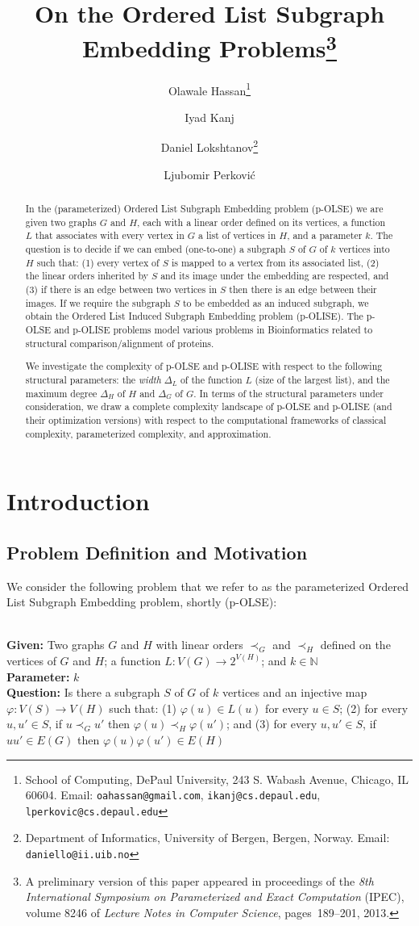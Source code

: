 \documentclass[11pt]{article}
\date{}
\title{On the Ordered List Subgraph Embedding Problems\footnote{A preliminary version of this paper appeared in proceedings of the {\em 8th International Symposium on Parameterized and Exact Computation} (IPEC), volume 8246 of {\em Lecture Notes in Computer Science}, pages~189--201, 2013.}}
\author{
{\sc Olawale Hassan}\footnote{School of
Computing, DePaul University, 243 S. Wabash Avenue, Chicago, IL
60604. Email: {\tt oahassan@gmail.com}, {\tt ikanj@cs.depaul.edu}, {\tt lperkovic@cs.depaul.edu}}
\and
{\sc Iyad Kanj}\footnotemark[2]
\and
{\sc Daniel Lokshtanov}\thanks{Department of Informatics,
University of Bergen, Bergen, Norway.  Email: {\tt daniello@ii.uib.no}}
\and
{\sc Ljubomir Perkovi\'{c}}\footnotemark[2]
}
\newcommand{\paramproblem}[4]{\noindent {\sc #1}
\\
{\bf Given:} #2\\
{\bf Parameter:} #3\\
{\bf Question:} #4}
\newcommand{\nat}{\mathbb{N}}
\let\phi=\varphi
\begin{document}
\maketitle

\begin{abstract}
In the (parameterized) {\sc Ordered List Subgraph Embedding} problem (p-OLSE) we are given two graphs $G$ and $H$, each with a linear order defined on its vertices, a function $L$ that associates with every vertex in $G$ a list of vertices in $H$, and a parameter $k$. The question is to decide if we can embed (one-to-one) a subgraph $S$ of $G$ of $k$ vertices into $H$ such that: (1) every vertex of $S$ is mapped to a vertex from its associated list, (2) the linear orders inherited by $S$ and its image under the embedding are respected, and (3) if there is an edge between two vertices in $S$ then there is an edge between their images. If we require the subgraph $S$ to be embedded as an induced subgraph, we obtain the {\sc Ordered List Induced Subgraph Embedding} problem (p-OLISE). The p-OLSE and p-OLISE problems model various problems in Bioinformatics related to structural comparison/alignment of proteins.

We investigate the complexity of p-OLSE and p-OLISE with respect to the following structural parameters: the {\em width} $\Delta_L$ of the function $L$ (size of the largest list), and the maximum degree $\Delta_H$ of $H$ and $\Delta_G$ of $G$. In terms of the structural parameters under consideration, we draw a complete complexity landscape of p-OLSE and p-OLISE (and their optimization versions) with respect to the computational frameworks of classical complexity, parameterized complexity, and approximation.
\end{abstract}


\section{Introduction} \label{sec:intro}
\subsection{Problem Definition and Motivation}
\label{subsec:motivation}
We consider the following problem that we refer to as the parameterized {\sc Ordered List Subgraph Embedding} problem, shortly (p-OLSE):

\paramproblem{} {Two graphs $G$ and $H$ with linear orders $\prec_G$ and $\prec_{H}$ defined on the vertices of $G$ and $H$; a function $L : V(G) \longrightarrow 2^{V(H)}$; and $k \in \nat$}{$k$}{Is there a subgraph $S$ of $G$ of $k$ vertices and an injective map $\phi: V(S) \longrightarrow V(H)$ such that: (1) $\phi(u) \in L(u)$ for every $u \in S$; (2) for every $u, u' \in S$, if $u \prec_G u'$ then $\phi(u) \prec_H \phi(u')$; and (3) for every $u, u' \in S$, if $uu' \in E(G)$ then $\phi(u)\phi(u') \in E(H)$} \\
\end{document}
